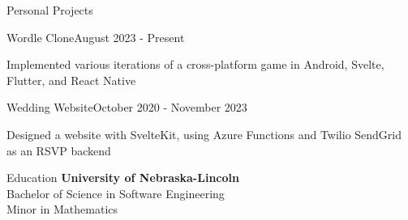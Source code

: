 \documentclass[
	11pt, %
]{article} %
\begin{document}
\begin{rSection}{Personal Projects}

	\begin{rSubsection}{Wordle Clone}{August 2023 - Present}{}{}
		\item Implemented various iterations of a cross-platform game in Android, Svelte, Flutter, and React Native
	\end{rSubsection}

	\begin{rSubsection}{Wedding Website}{October 2020 - November 2023}{}{}
		\item Designed a website with SvelteKit, using Azure Functions and Twilio SendGrid as an RSVP backend
	\end{rSubsection}

\end{rSection}

\begin{rSection}{Education}
	\textbf{University of Nebraska-Lincoln} \\
	Bachelor of Science in Software Engineering \\
	Minor in Mathematics
\end{rSection}





\end{document}

